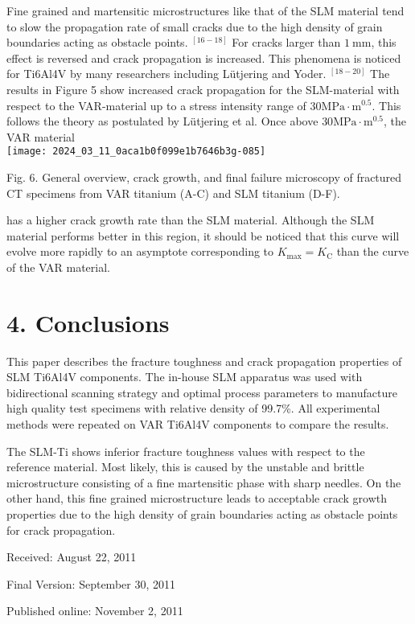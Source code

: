 \documentclass[10pt]{article}
\begin{document}
Fine grained and martensitic microstructures like that of the SLM material tend to slow the propagation rate of small cracks due to the high density of grain boundaries acting as obstacle points. ${ }^{[16-18]}$ For cracks larger than $1 \mathrm{~mm}$, this effect is reversed and crack propagation is increased. This phenomena is noticed for Ti6Al4V by many researchers including Lütjering and Yoder. ${ }^{[18-20]}$ The results in Figure 5 show increased crack propagation for the SLM-material with respect to the VAR-material up to a stress intensity range of $30 \mathrm{MPa} \cdot \mathrm{m}^{0.5}$. This follows the theory as postulated by Lütjering et al. Once above $30 \mathrm{MPa} \cdot \mathrm{m}^{0.5}$, the VAR material\\
\texttt{[image: 2024\_03\_11\_0aca1b0f099e1b7646b3g-085]}

Fig. 6. General overview, crack growth, and final failure microscopy of fractured CT specimens from VAR titanium (A-C) and SLM titanium (D-F).

has a higher crack growth rate than the SLM material. Although the SLM material performs better in this region, it should be noticed that this curve will evolve more rapidly to an asymptote corresponding to $K_{\max }=K_{\mathrm{C}}$ than the curve of the VAR material.

\section*{4. Conclusions}
This paper describes the fracture toughness and crack propagation properties of SLM Ti6Al4V components. The in-house SLM apparatus was used with bidirectional scanning strategy and optimal process parameters to manufacture high quality test specimens with relative density of 99.7\%. All experimental methods were repeated on VAR Ti6Al4V components to compare the results.

The SLM-Ti shows inferior fracture toughness values with respect to the reference material. Most likely, this is caused by the unstable and brittle microstructure consisting of a fine martensitic phase with sharp needles. On the other hand, this fine grained microstructure leads to acceptable crack growth properties due to the high density of grain boundaries acting as obstacle points for crack propagation.

Received: August 22, 2011

Final Version: September 30, 2011

Published online: November 2, 2011
\end{document}

